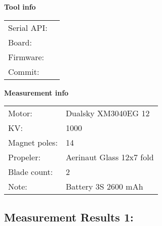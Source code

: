 \documentclass[10pt]{article}
\begin{document}
\noindent
{\large \bf Tool info}
\vspace{3mm}

\noindent
\begin{tabular}{ll}
Serial API:  & \\ 
Board:       & \\ 
Firmware:    & \\ 
Commit:      & 
\end{tabular}
\vspace{3mm}

\noindent
{\large \bf Measurement info}
\vspace{3mm}

\noindent
\begin{tabular}{ll}
Motor:        & Dualsky XM3040EG 12\\ 
KV:           & 1000\\ 
Magnet poles: & 14\\ 
Propeler:     & Aerinaut Glass 12x7 fold\\ 
Blade count:  & 2\\ 
Note:         & Battery 3S 2600 mAh
\end{tabular}

\vspace{3mm}


\subsection*{\large \bf Measurement Results 1:}
\end{document}
